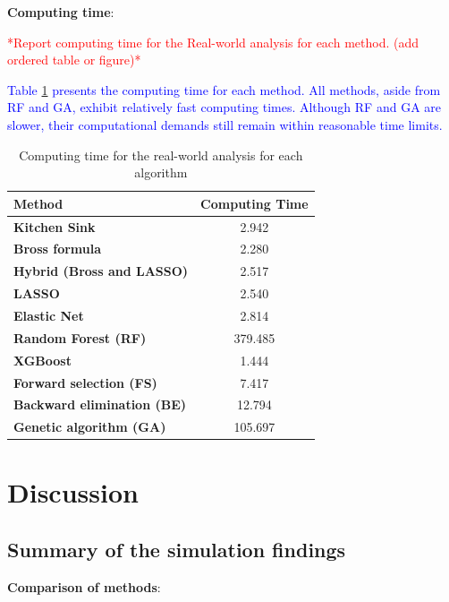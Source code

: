 \documentclass[sn-vancouver,Numbered,lineno,pdflatex]{sn-jnl}
\begin{document}
\textbf{Computing time}:

\textcolor{red}{*Report computing time for the Real-world analysis for each method. (add ordered table or figure)*}

\textcolor{blue}{Table \ref{tab:computing-time} presents the computing time for each method. All methods, aside from RF and GA, exhibit relatively fast computing times. Although RF and GA are slower, their computational demands still remain within reasonable time limits.}

\begin{table}[htbp]
\centering
\caption{Computing time for the real-world analysis for each algorithm}
\label{tab:computing-time}
\begin{tabular}{lc}
\toprule
\textbf{Method} & \textbf{Computing Time}\\
\midrule
\textbf{Kitchen Sink} & 2.942 \\
\textbf{Bross formula} & 2.280 \\
\textbf{Hybrid (Bross and LASSO)} & 2.517 \\
\textbf{LASSO} & 2.540  \\
\textbf{Elastic Net} & 2.814 \\
\textbf{Random Forest (RF)} & 379.485 \\
\textbf{XGBoost} & 1.444 \\
\textbf{Forward selection (FS)} & 7.417 \\
\textbf{Backward elimination (BE)} & 12.794 \\
\textbf{Genetic algorithm (GA)} & 105.697 \\
\bottomrule
\end{tabular}
\end{table}

\section{Discussion}\label{discussion}

\subsection{Summary of the simulation
findings}\label{summary-of-the-simulation-findings}

\textbf{Comparison of methods}:
\end{document}
